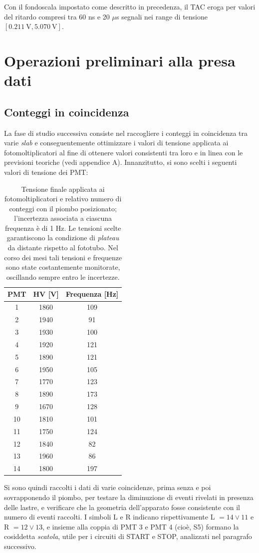 \documentclass[10pt, oneside, a4paper]{article}   	%
\begin{document}
Con il fondoscala impostato come descritto in precedenza, il TAC eroga per valori del ritardo compresi tra 60 ns e 20 $\mu$s segnali nei range di tensione $[0.211 \ \mbox{V}, 5.070 \ \mbox{V}]$.
%
%
\section{Operazioni preliminari alla presa dati}
\subsection{Conteggi in coincidenza}
La fase di studio successiva consiste nel raccogliere i conteggi in coincidenza tra varie \emph{slab} e conseguentemente ottimizzare i valori di tensione applicata ai fotomoltiplicatori al fine di ottenere valori consistenti tra loro e in linea con le previsioni teoriche (vedi appendice A). 
Innanzitutto, si sono scelti i seguenti valori di tensione dei PMT: 
\begin{table}[H]
		\centering
	\begin{tabular}{ccc}
		\toprule
		PMT	&	HV [V]	&	Frequenza [Hz]\\	
		\midrule
		1	&	1860	&	109	\\
		2	&	1940	&	91	\\
		3	&	1930	&	100	\\
		4	&	1920	&	121	\\
		5	&	1890	&	121	\\
		6	&	1950	&	105	\\
		7	&	1770	&	123	\\
		8	&	1890	&	173	\\
		9	&	1670	&	128	\\
		10	&	1810	&	101	\\
		11	&	1750	&	124	\\
		12	&	1840	&	82	\\
		13	&	1960	&	86	\\
		14	&	1800	&	197	\\
		\bottomrule
	\end{tabular}
	\caption{Tensione finale applicata ai fotomoltiplicatori e relativo numero di conteggi con il piombo posizionato; l'incertezza associata a ciascuna frequenza è di 1 Hz. Le tensioni scelte garantiscono la condizione di \emph{plateau} da distante rispetto al fototubo. Nel corso dei mesi tali tensioni e frequenze sono state costantemente monitorate, oscillando sempre entro le incertezze.}
	\label{HV_counts}
\end{table}
Si sono quindi raccolti i dati di varie coincidenze, prima senza e poi sovrapponendo il piombo, per testare la diminuzione di eventi rivelati in presenza delle lastre, e verificare che la geometria dell'apparato fosse consistente con il numero di eventi raccolti. I simboli L e R indicano rispettivamente L $= 14 \vee 11 $ e R $= 12 \vee 13$, e insieme alla coppia di PMT 3 e PMT 4 (cioè, S5) formano la cosiddetta \emph{scatola}, utile per i circuiti di START e STOP, analizzati nel paragrafo successivo.
\end{document}
